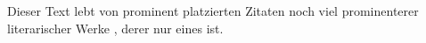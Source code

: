 \documentclass[a5paper, pdftex, 12pt]{scrartcl}
\begin{document}
\thispagestyle{empty}

Dieser Text lebt von prominent platzierten Zitaten \cite[u.\thinspace a.][]{Frank1957} noch viel prominenterer literarischer Werke \cite[vgl.][S. 7]{Orwell1957}, derer \cite{Hawking1988} nur eines ist.


\end{document}
